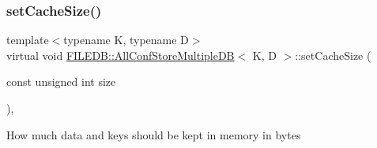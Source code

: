 \subsubsection{\texorpdfstring{setCacheSize()}{setCacheSize()}\hspace{0.1cm}{\footnotesize\ttfamily [2/3]}}
{\footnotesize\ttfamily template$<$typename K, typename D$>$ \\
virtual void \mbox{\hyperlink{classFILEDB_1_1AllConfStoreMultipleDB}{F\+I\+L\+E\+D\+B\+::\+All\+Conf\+Store\+Multiple\+DB}}$<$ K, D $>$\+::set\+Cache\+Size (\begin{DoxyParamCaption}\item[{const unsigned int}]{size }\end{DoxyParamCaption})\hspace{0.3cm}{\ttfamily [inline]}, {\ttfamily [virtual]}}

How much data and keys should be kept in memory in bytes

